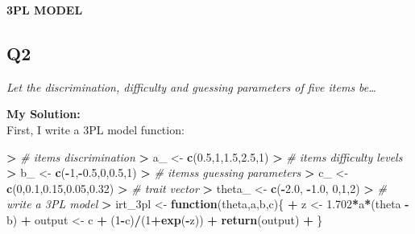 \documentclass[
]{article}
\newenvironment{Shaded}{\begin{snugshade}}{\end{snugshade}}
\newcommand{\CommentTok}[1]{\textcolor[rgb]{0.56,0.35,0.01}{\textit{#1}}}
\newcommand{\ControlFlowTok}[1]{\textcolor[rgb]{0.13,0.29,0.53}{\textbf{#1}}}
\newcommand{\DecValTok}[1]{\textcolor[rgb]{0.00,0.00,0.81}{#1}}
\newcommand{\ErrorTok}[1]{\textcolor[rgb]{0.64,0.00,0.00}{\textbf{#1}}}
\newcommand{\FloatTok}[1]{\textcolor[rgb]{0.00,0.00,0.81}{#1}}
\newcommand{\FunctionTok}[1]{\textcolor[rgb]{0.13,0.29,0.53}{\textbf{#1}}}
\newcommand{\NormalTok}[1]{#1}
\newcommand{\OtherTok}[1]{\textcolor[rgb]{0.56,0.35,0.01}{#1}}
\newcommand{\SpecialCharTok}[1]{\textcolor[rgb]{0.81,0.36,0.00}{\textbf{#1}}}
\begin{document}
\textbf{3PL MODEL}

\hypertarget{q2}{%
\subsection{Q2}\label{q2}}

\emph{Let the discrimination, difficulty and guessing parameters of five
items be\ldots{}}

\textbf{My Solution:}\\
First, I write a 3PL model function:

\begin{Shaded}
\begin{Highlighting}[]
\SpecialCharTok{\textgreater{}} \CommentTok{\# items\textquotesingle{} discrimination}
\ErrorTok{\textgreater{}}\NormalTok{ a\_ }\OtherTok{\textless{}{-}} \FunctionTok{c}\NormalTok{(}\FloatTok{0.5}\NormalTok{,}\DecValTok{1}\NormalTok{,}\FloatTok{1.5}\NormalTok{,}\FloatTok{2.5}\NormalTok{,}\DecValTok{1}\NormalTok{)}
\SpecialCharTok{\textgreater{}} \CommentTok{\# items\textquotesingle{} difficulty levels}
\ErrorTok{\textgreater{}}\NormalTok{ b\_ }\OtherTok{\textless{}{-}} \FunctionTok{c}\NormalTok{(}\SpecialCharTok{{-}}\DecValTok{1}\NormalTok{,}\SpecialCharTok{{-}}\FloatTok{0.5}\NormalTok{,}\DecValTok{0}\NormalTok{,}\FloatTok{0.5}\NormalTok{,}\DecValTok{1}\NormalTok{)}
\SpecialCharTok{\textgreater{}} \CommentTok{\# items\textquotesingle{}s guessing parameters}
\ErrorTok{\textgreater{}}\NormalTok{ c\_ }\OtherTok{\textless{}{-}} \FunctionTok{c}\NormalTok{(}\DecValTok{0}\NormalTok{,}\FloatTok{0.1}\NormalTok{,}\FloatTok{0.15}\NormalTok{,}\FloatTok{0.05}\NormalTok{,}\FloatTok{0.32}\NormalTok{)}
\SpecialCharTok{\textgreater{}} \CommentTok{\# trait vector}
\ErrorTok{\textgreater{}}\NormalTok{ theta\_ }\OtherTok{\textless{}{-}} \FunctionTok{c}\NormalTok{(}\SpecialCharTok{{-}}\FloatTok{2.0}\NormalTok{, }\SpecialCharTok{{-}}\FloatTok{1.0}\NormalTok{, }\DecValTok{0}\NormalTok{,}\DecValTok{1}\NormalTok{,}\DecValTok{2}\NormalTok{)}
\SpecialCharTok{\textgreater{}} \CommentTok{\# write a 3PL model}
\ErrorTok{\textgreater{}}\NormalTok{ irt\_3pl }\OtherTok{\textless{}{-}} \ControlFlowTok{function}\NormalTok{(theta,a,b,c)\{}
\SpecialCharTok{+}\NormalTok{   z }\OtherTok{\textless{}{-}} \FloatTok{1.702}\SpecialCharTok{*}\NormalTok{a}\SpecialCharTok{*}\NormalTok{(theta }\SpecialCharTok{{-}}\NormalTok{ b)}
\SpecialCharTok{+}\NormalTok{   output }\OtherTok{\textless{}{-}}\NormalTok{ c }\SpecialCharTok{+}\NormalTok{ (}\DecValTok{1}\SpecialCharTok{{-}}\NormalTok{c)}\SpecialCharTok{/}\NormalTok{(}\DecValTok{1}\SpecialCharTok{+}\FunctionTok{exp}\NormalTok{(}\SpecialCharTok{{-}}\NormalTok{z))}
\SpecialCharTok{+}   \FunctionTok{return}\NormalTok{(output)}
\SpecialCharTok{+}\NormalTok{ \}}
\end{Highlighting}
\end{Shaded}
\end{document}
